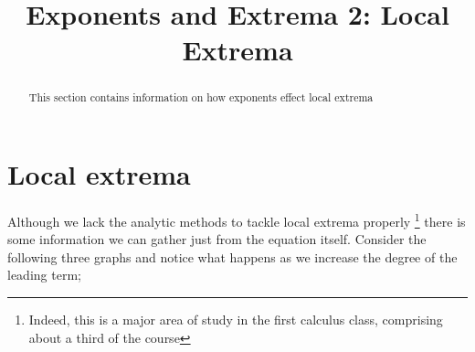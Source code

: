\documentclass{ximera}
\title{Exponents and Extrema 2: Local Extrema}
\begin{document}
\begin{abstract}
    This section contains information on how exponents effect local extrema
\end{abstract}
\maketitle


\section*{Local extrema}


Although we lack the analytic methods to tackle local extrema properly%
\footnote{Indeed, this is a major area of study in the first calculus class, comprising about a third of the course}
there is some information we can gather just from the equation itself. Consider the following three graphs and notice what happens as we increase the degree of the leading term;
\end{document}

